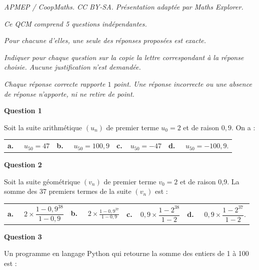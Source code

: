 \documentclass[10pt]{article}
\begin{document}
\noindent\textit{APMEP / CoopMaths. CC BY-SA. Présentation adaptée par Maths Explorer.}\par\medskip
\medskip

\emph{Ce QCM comprend 5 questions indépendantes.}

\emph{Pour chacune d'elles, une seule des réponses proposées est exacte.}
 
\emph{Indiquer pour chaque question sur la copie la lettre correspondant à la réponse
choisie. Aucune justification n'est demandée.}

\emph{Chaque réponse correcte rapporte $1$ point. Une réponse incorrecte ou une absence de
réponse n'apporte, ni ne retire de point.}

\medskip

 \textbf{Question 1}

 \medskip

 Soit la suite arithmétique $\left(u_n\right)$ de premier terme $u_0 = 2$ et de raison $0,9$. On a :
\begin{center}
\begin{tabularx}{\linewidth}{*{4}{X}}
\textbf{a.~~} $u_{50}= 47$ &\textbf{b.~~} $u_{50}= 100,9$&\textbf{c.~~}$u_{50}= -47$& \textbf{d.~~} $u_{50}= -100,9$.
\end{tabularx}
\end{center}

\medskip

 \textbf{Question 2}

\medskip

Soit la suite géométrique $\left(v_n\right)$ de premier terme $v_0 = 2$ et de raison 0,9.
La somme des 37 premiers termes de la suite $\left(v_n\right)$ est :

\medskip

\begin{tabularx}{\linewidth}{*{4}{X}}
\textbf{a.~~} $2 \times \dfrac{1-0,9^{38}}{1-0,9}$ &\textbf{b.~~} $2\times \frac{1-0,9^{37}}{1- 0,9}$&\textbf{c.~~}$ 0,9\times \dfrac{1-2^{38}}{1-2}$& \textbf{d.~~} $0,9 \times \dfrac{1-2^{37}}{1-2}$.
\end{tabularx}

\medskip

\textbf{Question 3}

 \medskip
 Un programme en langage Python qui retourne la somme des entiers de 1 à 100 est :
 
 \medskip
\end{document}
